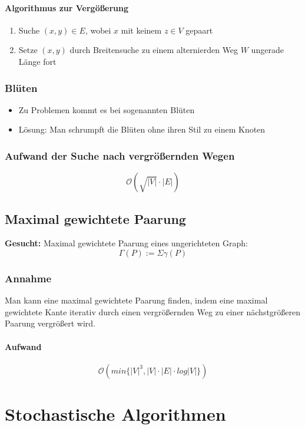 \paragraph{Algorithmus zur Vergößerung}
\begin{enumerate}
	\item Suche \((x,y) \in E\), wobei \(x\) mit keinem \(z\in V\) gepaart
	\item Setze \((x,y)\) durch Breitensuche zu einem alternierden Weg \(W\) ungerade Länge fort
\end{enumerate}

\subsubsection{Blüten}
\begin{itemize}
	\item Zu Problemen kommt es bei sogenannten Blüten
	\item Lösung: Man schrumpft die Blüten ohne ihren Stil zu einem Knoten
\end{itemize}

\subsubsection{Aufwand der Suche nach vergrößernden Wegen}
\[\mathcal{O}(\sqrt{|V|} \cdot |E|)\]


\subsection{Maximal gewichtete Paarung}
\textbf{Gesucht:} Maximal gewichtete Paarung eines ungerichteten Graph:
\[\Gamma(P) := \Sigma \gamma (P)\]

\subsubsection{Annahme}
Man kann eine maximal gewichtete Paarung finden, indem eine maximal gewichtete Kante iterativ durch einen vergrößernden Weg zu einer nächstgrößeren Paarung vergrößert wird.

\paragraph{Aufwand}
\[\mathcal{O}(min\{|V|^3, |V| \cdot |E| \cdot log|V|\})\]



\section{Stochastische Algorithmen}

